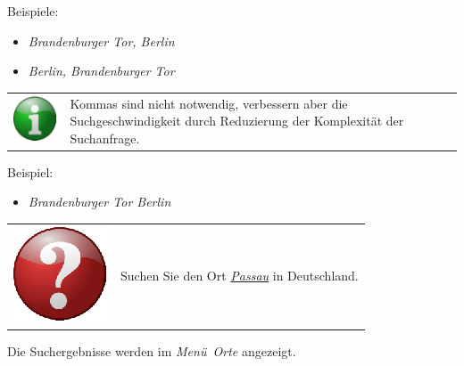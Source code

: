 \documentclass[10pt]{scrreprt}
\newcommand{\textref}[1]{\mbox{\raisebox{0.1ex}{\small$\rightarrow$ }\textit{#1}}}
\begin{document}
\vspace{3mm}
Beispiele: 
\begin{itemize}
\item \textit{Brandenburger Tor, Berlin}
\item \textit{Berlin, Brandenburger Tor}
\end{itemize}

\vspace{3mm}
\begin{tabular}{>{\centering \arraybackslash}m{1cm} m{14cm}}
\includegraphics[scale=0.5]{images/info.eps} & Kommas sind nicht notwendig, verbessern aber die Suchgeschwindigkeit durch Reduzierung der Komplexität der Suchanfrage. \\ 
\end{tabular} 

\vspace{3mm}
Beispiel:
\begin{itemize}
\item \textit{Brandenburger Tor Berlin}
\end{itemize}


\vspace{3mm}
\begin{tabular}{>{\centering \arraybackslash}m{1cm} m{14cm}}
\includegraphics[scale=0.5]{images/quest.eps} & Suchen Sie den Ort \underline{\textit{Passau}} in Deutschland.
\end{tabular}


\vspace{3mm}
Die Suchergebnisse werden im \textref{Menü Orte} angezeigt.
\end{document}
